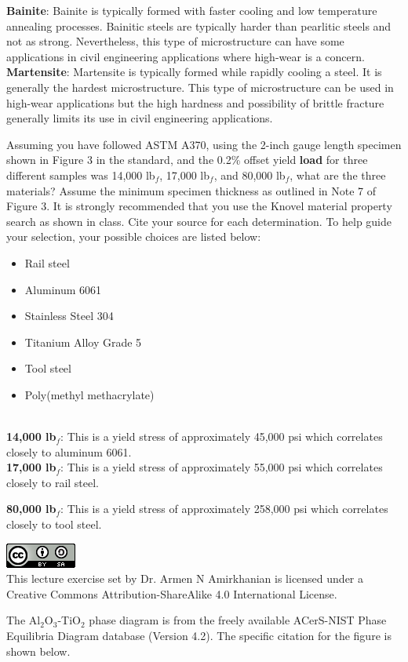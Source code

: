 \documentclass[addpoints,12pt,answers]{exam}
\begin{document}
\begin{questions}
\begin{solution}
\textbf{Bainite}: Bainite is typically formed with faster cooling and low temperature annealing processes. Bainitic steels are typically harder than pearlitic steels and not as strong. Nevertheless, this type of microstructure can have some applications in civil engineering applications where high-wear is a concern.\\

\textbf{Martensite}: Martensite is typically formed while rapidly cooling a steel. It is generally the hardest microstructure. This type of microstructure can be used in high-wear applications but the high hardness and possibility of brittle fracture generally limits its use in civil engineering applications.
\end{solution}

\question[6] Assuming you have followed ASTM A370, using the 2-inch gauge length specimen shown in Figure 3 in the standard, and the 0.2\% offset yield \textbf{load} for three different samples was 14,000 lb$_f$, 17,000 lb$_f$, and 80,000 lb$_f$, what are the three materials? Assume the minimum specimen thickness as outlined in Note 7 of Figure 3. It is strongly recommended that you use the Knovel material property search as shown in class. Cite your source for each determination. To help guide your selection, your possible choices are listed below:
\begin{itemize}
    \item Rail steel
    \item Aluminum 6061
    \item Stainless Steel 304
    \item Titanium Alloy Grade 5
    \item Tool steel
    \item Poly(methyl methacrylate)
\end{itemize}

\begin{solution}\\
\textbf{14,000 lb$_f$}: This is a yield stress of approximately 45,000 psi which correlates closely to aluminum 6061.\\

\textbf{17,000 lb$_f$}: This is a yield stress of approximately 55,000 psi which correlates closely to rail steel.

\textbf{80,000 lb$_f$}: This is a yield stress of approximately 258,000 psi which correlates closely to tool steel.
\end{solution}

\end{questions}
\begin{center}
\includegraphics[scale=0.6]{88x31.png}\\
This lecture exercise set by Dr. Armen N Amirkhanian is licensed under a Creative Commons Attribution-ShareAlike 4.0 International License.
\end{center}
The Al$_2$O$_3$-TiO$_2$ phase diagram is from the freely available ACerS-NIST Phase Equilibria Diagram database (Version 4.2). The specific citation for the figure is shown below.
\end{document}
